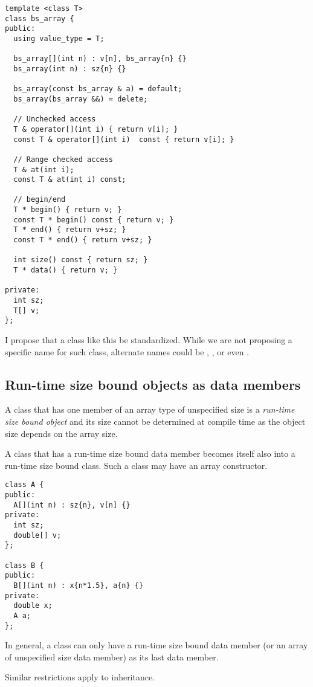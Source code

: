 \begin{lstlisting}
template <class T>
class bs_array {
public:
  using value_type = T;

  bs_array[](int n) : v[n], bs_array{n} {}
  bs_array(int n) : sz{n} {}

  bs_array(const bs_array & a) = default;
  bs_array(bs_array &&) = delete;

  // Unchecked access
  T & operator[](int i) { return v[i]; }
  const T & operator[](int i)  const { return v[i]; }

  // Range checked access
  T & at(int i);
  const T & at(int i) const;

  // begin/end
  T * begin() { return v; }
  const T * begin() const { return v; }
  T * end() { return v+sz; }
  const T * end() { return v+sz; }

  int size() const { return sz; }
  T * data() { return v; }

private:
  int sz;
  T[] v;
};
\end{lstlisting}

I propose that a class like this be standardized. While we are not proposing a
specific name for such class, alternate names could be ,
,  or even .

\subsection{Run-time size bound objects as data members}

A class that has one member of an array type of unspecified size is a
\emph{run-time size bound object} and its size cannot be determined at compile
time as the object size depends on the array size.

A class that has a run-time size bound data member becomes itself also into a
run-time size bound class. Such a class may have an array constructor.

\begin{lstlisting}
class A {
public:
  A[](int n) : sz{n}, v[n] {}
private:
  int sz;
  double[] v;
};

class B {
public:
  B[](int n) : x{n*1.5}, a{n} {}
private:
  double x;
  A a;
};
\end{lstlisting}

In general, a class can only have a run-time size bound data member (or 
an array of unspecified size data member) as its last data member. 

Similar restrictions apply to inheritance.

